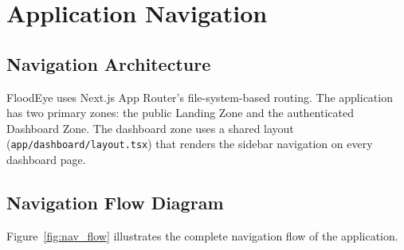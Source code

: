 \chapter{Application Navigation}

\section{Navigation Architecture}

FloodEye uses Next.js App Router's file-system-based routing. The application has two primary zones: the public Landing Zone and the authenticated Dashboard Zone. The dashboard zone uses a shared layout (\texttt{app/\allowbreak{}dashboard/\allowbreak{}layout.\allowbreak{}tsx}) that renders the sidebar navigation on every dashboard page.

\section{Navigation Flow Diagram}

Figure~\ref{fig:nav_flow} illustrates the complete navigation flow of the application.

